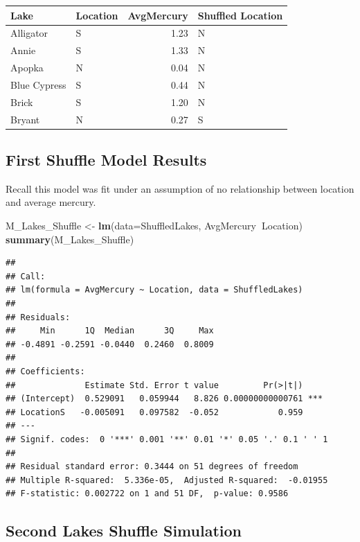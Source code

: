 \documentclass[]{book}
\newenvironment{Shaded}{\begin{snugshade}}{\end{snugshade}}
\newcommand{\KeywordTok}[1]{\textcolor[rgb]{0.13,0.29,0.53}{\textbf{#1}}}
\newcommand{\DataTypeTok}[1]{\textcolor[rgb]{0.13,0.29,0.53}{#1}}
\newcommand{\StringTok}[1]{\textcolor[rgb]{0.31,0.60,0.02}{#1}}
\newcommand{\OperatorTok}[1]{\textcolor[rgb]{0.81,0.36,0.00}{\textbf{#1}}}
\newcommand{\NormalTok}[1]{#1}
\begin{document}
\begin{tabular}{l|l|r|l}
\hline
Lake & Location & AvgMercury & Shuffled Location\\
\hline
Alligator & S & 1.23 & N\\
\hline
Annie & S & 1.33 & N\\
\hline
Apopka & N & 0.04 & N\\
\hline
Blue Cypress & S & 0.44 & N\\
\hline
Brick & S & 1.20 & N\\
\hline
Bryant & N & 0.27 & S\\
\hline
\end{tabular}

\subsection{First Shuffle Model
Results}\label{first-shuffle-model-results}

Recall this model was fit under an assumption of no relationship between
location and average mercury.

\begin{Shaded}
\begin{Highlighting}[]
\NormalTok{M_Lakes_Shuffle <-}\StringTok{ }\KeywordTok{lm}\NormalTok{(}\DataTypeTok{data=}\NormalTok{ShuffledLakes, AvgMercury}\OperatorTok{~}\NormalTok{Location)}
\KeywordTok{summary}\NormalTok{(M_Lakes_Shuffle)}
\end{Highlighting}
\end{Shaded}

\begin{verbatim}
## 
## Call:
## lm(formula = AvgMercury ~ Location, data = ShuffledLakes)
## 
## Residuals:
##     Min      1Q  Median      3Q     Max 
## -0.4891 -0.2591 -0.0440  0.2460  0.8009 
## 
## Coefficients:
##              Estimate Std. Error t value         Pr(>|t|)    
## (Intercept)  0.529091   0.059944   8.826 0.00000000000761 ***
## LocationS   -0.005091   0.097582  -0.052            0.959    
## ---
## Signif. codes:  0 '***' 0.001 '**' 0.01 '*' 0.05 '.' 0.1 ' ' 1
## 
## Residual standard error: 0.3444 on 51 degrees of freedom
## Multiple R-squared:  5.336e-05,  Adjusted R-squared:  -0.01955 
## F-statistic: 0.002722 on 1 and 51 DF,  p-value: 0.9586
\end{verbatim}

\subsection{Second Lakes Shuffle
Simulation}\label{second-lakes-shuffle-simulation}
\end{document}
